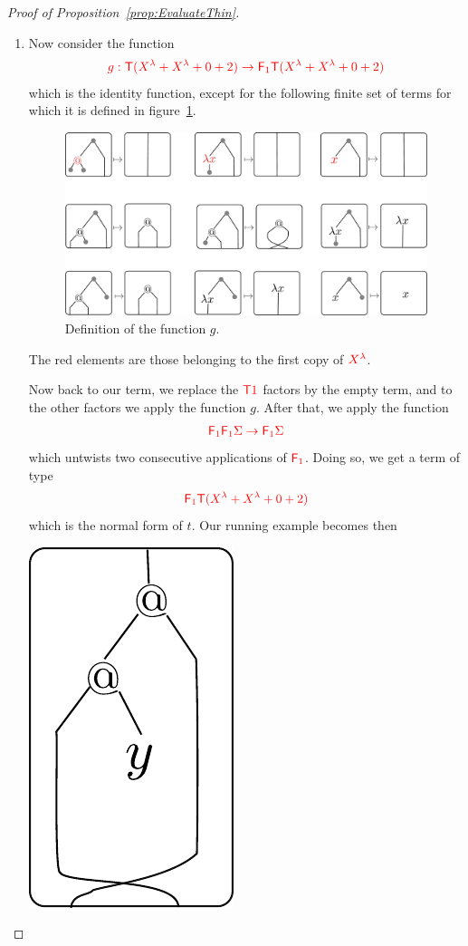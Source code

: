 \begin{proof}[Proof of Proposition~\ref{prop:EvaluateThin}]
\begin{enumerate}
\item Now consider the function 
 \begin{align*}
 {\color{red}{g: {\color{red}{\mathsf T}}(X^\lambda+X^\lambda+0+2) \to {\color{red}{\mathsf F_{1}}}{\color{red}{\mathsf T}}(X^\lambda+X^\lambda+0+2)}}
 \end{align*}
 which is the identity function, except for the following finite set of terms for which it is defined in figure~\ref{fig:definition-g}.
\begin{figure}
\begin{center}
\includegraphics[scale=.3]{pictures/function-g}
\end{center}
\caption{Definition of the function $g$.} \label{fig:definition-g}
\end{figure}
The red elements are those belonging to the first copy of ${\color{red}{{X}^{{\color{red}{\lambda}}}}}$.
\smallskip

Now back to our term, we replace the  ${\color{red}{{\color{red}{\mathsf T}}1}}$ factors by the empty term, and to the other factors we apply the function $g$. After that, we apply the function 
\begin{align*}
{\color{red}{{\color{red}{\mathsf F_{1}}}{\color{red}{\mathsf F_{1}}}\Sigma \to {\color{red}{\mathsf F_{1}}}\Sigma}}
\end{align*}
which untwists two consecutive applications of $\reduce 1$. Doing so, we get a term of type  $${\color{red}{{\color{red}{\mathsf F_{1}}}{\color{red}{\mathsf T}}(X^\lambda+X^\lambda+0+2)}}$$ which is  the normal form of $t$. Our running example becomes then
\begin{center}
\includegraphics[scale=.4]{pictures/running-thin-5}
\end{center}


\end{enumerate}
\end{proof}
